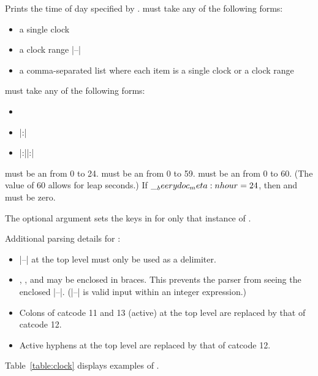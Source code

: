 \documentclass{beerydoc}
\begin{document}
\begin{codedoc}{\clock}
  \begin{syntax}
      
  \end{syntax}
  Prints the time of day specified by .
   must take any of the following forms:
  \begin{itemize}
    \item a single clock 
    \item a clock range |--|
    \item
    a comma-separated list where each item is a single clock or a clock range
  \end{itemize}

   must take any of the following forms:
  \begin{itemize}
    \item {}
    \item {}|:|
    \item {}|:||:|
  \end{itemize}

   must be an  from \num{0} to \num{24}.
   must be an  from \num{0} to \num{59}.
   must be an  from \num{0} to \num{60}.
  (The value of \num{60} allows for leap seconds.)
  If $\__beerydoc_meta:n {hour}=\num{24}$, then  and  must be zero.

  The optional argument sets the  keys in 
  for only that instance of .

  Additional parsing details for :
  \begin{itemize}
    \item |--| at the top level must only be used as a delimiter.
    \item
    , , and  may be enclosed in braces.
    This prevents the parser from seeing the enclosed |--|.
    (|--| is valid input within an integer expression.)
    \item
    Colons of catcode 11 and 13 (active) at the top level are replaced by that
    of catcode 12.
    \item Active hyphens at the top level are replaced by that of catcode 12.
  \end{itemize}

  Table~\ref{table:clock} displays examples of .
\end{codedoc}
\end{document}

